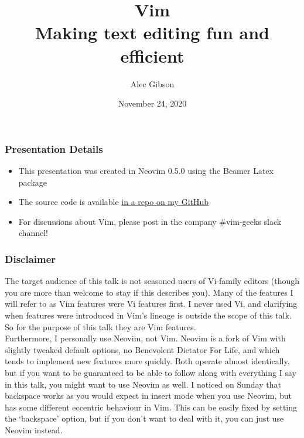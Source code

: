 \documentclass{beamer}
\title[\textcolor{white}{Vim - Fun and Efficient}]{\huge Vim \\
    \large Making text editing fun and efficient
}
\author{Alec Gibson}
\institute[BlueCat]
{
    BlueCat Networks \\
    \medskip
    \textit{agibson@bluecatnetworks.com}
}
\date{November 24, 2020}
\begin{document}
\begin{frame}[fragile]
    \titlepage %
\end{frame}

\begin{frame}[fragile]
    \frametitle{Presentation Details}
    \begin{itemize}
	\item This presentation was created in Neovim 0.5.0 using the Beamer Latex package
	\item The source code is available \href{https://github.com/alec-gibson/vim-fun-and-efficient}{in a repo on my GitHub}
	\item For discussions about Vim, please post in the company \#vim-geeks slack channel!
    \end{itemize}
\end{frame}

\begin{frame}[fragile]
    \frametitle{Disclaimer}
    \small The target audience of this talk is not seasoned users of Vi-family editors (though you are more than welcome to stay if this describes you). Many of the features I will refer to as Vim features were Vi features first. I never used Vi, and clarifying when features were introduced in Vim's lineage is outside the scope of this talk. So for the purpose of this talk they are Vim features.\\
    \vspace{0.5cm}
    Furthermore, I personally use Neovim, not Vim. Neovim is a fork of Vim with slightly tweaked default options, no Benevolent Dictator For Life, and which tends to implement new features more quickly. Both operate almost identically, but if you want to be guaranteed to be able to follow along with everything I say in this talk, you might want to use Neovim as well. I noticed on Sunday that backspace works as you would expect in insert mode when you use Neovim, but has some different eccentric behaviour in Vim. This can be easily fixed by setting the `backspace' option, but if you don't want to deal with it, you can just use Neovim instead.
\end{frame}
\end{document}

